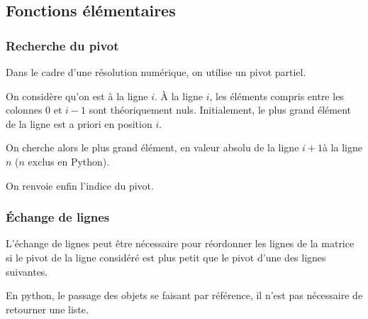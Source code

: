 \documentclass[10pt]{article}
\newif\ifprof
\begin{document}
\subsection{Fonctions élémentaires}
\subsubsection{Recherche du pivot}
Dans le cadre d'une résolution numérique, on utilise un pivot partiel. 

\begin{py}
\ifprof
\begin{python}
def recherche_pivot(A,i):
    n = len(A) # le nombre de lignes
    j = i # la ligne du maximum provisoire
    for k in range(i+1, n):
        if abs(A[k][i]) > abs(A[j][i]):
            j = k # un nouveau maximum provisoire
    return j
\end{python}
\else
\vspace{5cm}
\fi
\end{py}


On considère qu'on est à la ligne $i$. \`A la ligne $i$, les éléments compris entre les colonnes 0 et $i-1$ sont théoriquement nuls. Initialement, le plus grand élément de la ligne est a priori en position $i$. 

On cherche alors le plus grand élément, en valeur absolu de la ligne $i+1$à la ligne $n$ ($n$ exclus en Python). 

On renvoie enfin l'indice du pivot. 

\subsubsection{Échange de lignes}

L'échange de lignes peut être nécessaire pour réordonner les lignes de la matrice si le pivot de la ligne considéré est plus petit que le pivot d'une des lignes suivantes.  

\begin{py}
\ifprof
\begin{python}
def echange_lignes(A,i,j):
    # Li <-->Lj
    A[i][:],A[j][:]=A[j][:],A[i][:]
\end{python}
\else
\vspace{5cm}
\fi
\end{py}

\begin{rem}
En python, le passage des objets se faisant par référence, il n'est pas nécessaire de retourner une liste. 
\end{rem}
\end{document}
